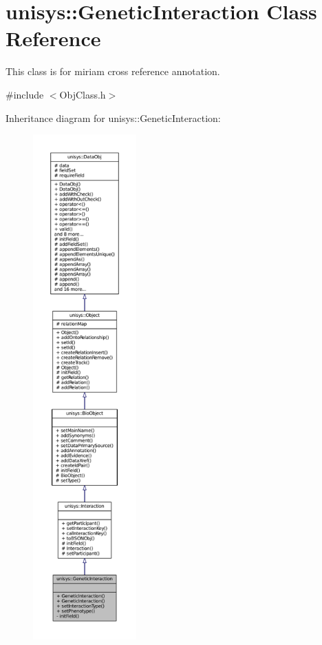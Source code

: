 \hypertarget{classunisys_1_1GeneticInteraction}{\section{unisys\-:\-:Genetic\-Interaction Class Reference}
\label{classunisys_1_1GeneticInteraction}
}


This class is for miriam cross reference annotation.  




{\ttfamily \#include $<$Obj\-Class.\-h$>$}



Inheritance diagram for unisys\-:\-:Genetic\-Interaction\-:
\nopagebreak
\begin{figure}[H]
\begin{center}
\leavevmode
\includegraphics[height=550pt]{classunisys_1_1GeneticInteraction__inherit__graph}
\end{center}
\end{figure}


